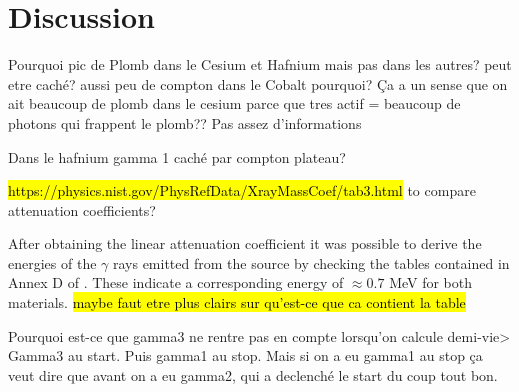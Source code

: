 \section{Discussion}
Pourquoi pic de Plomb dans le Cesium et Hafnium mais pas dans les autres?
peut etre caché? aussi peu de compton dans le Cobalt pourquoi?
Ça a un sense que on ait beaucoup de plomb dans le cesium parce que tres actif = beaucoup de photons qui frappent le plomb??
Pas assez d'informations

Dans le hafnium gamma 1 caché par compton plateau?


\hl{https://physics.nist.gov/PhysRefData/XrayMassCoef/tab3.html} to compare attenuation coefficients?

After obtaining the linear attenuation coefficient it was possible to derive the energies of the $\gamma$ rays emitted from the source by checking the tables contained in Annex D of \cite{notice_generale}.
These indicate a corresponding energy of $\approx 0.7$ MeV for both materials.
\hl{maybe faut etre plus clairs sur qu'est-ce que ca contient la table}

Pourquoi est-ce que gamma3 ne rentre pas en compte lorsqu'on calcule demi-vie>
Gamma3 au start. Puis gamma1 au stop. Mais si on a eu gamma1 au stop ça veut dire que avant on a eu gamma2, qui a declenché le start du coup tout bon.